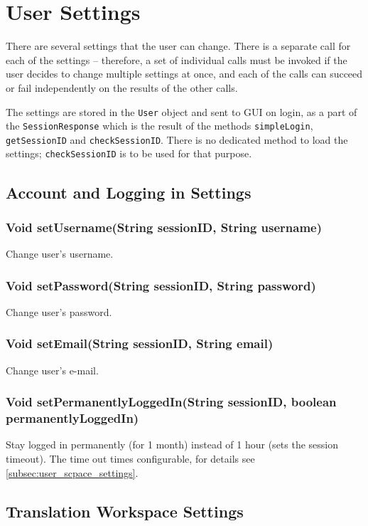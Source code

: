 {\section{User Settings}
\label{sec:rpc:settings}

There are several settings that the user can change. There is a separate call for each of the settings -- therefore, a set of individual calls must be invoked if the user decides to change multiple settings at once, and each of the calls can succeed or fail independently on the results of the other calls.

The settings are stored in the {\tt User} object and sent to GUI on login, as a part of the {\tt SessionResponse} which is the result of the methods {\tt simpleLogin}, {\tt getSessionID} and {\tt checkSessionID}. There is no dedicated method to load the settings; {\tt checkSessionID} is to be used for that purpose.

\subsection{Account and Logging in Settings}

\subsubsection{Void setUsername(String sessionID, String username)}
Change user's username.

\subsubsection{Void setPassword(String sessionID, String password)}
Change user's password.

\subsubsection{Void setEmail(String sessionID, String email)}
Change user's e-mail.

\subsubsection{Void setPermanentlyLoggedIn(String sessionID, boolean permanentlyLoggedIn)}
Stay logged in permanently (for 1 month) instead of 1 hour (sets the session timeout). The time out times configurable, for details see \ref{subsec:user_scpace_settings}.

\subsection{Translation Workspace Settings}

}
